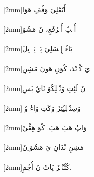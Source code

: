 \documentclass[a4paper, 12pt]{report}
\begin{document}
\begin{flushright}

{\scriptsize{}[2mm]}\textarabic{أَنْڠَلِيَ وَڤُڤِ هَوَا} \\ 

 \\ 

{\scriptsize{}[2mm]}\textarabic{أُپٖپٗ أُمٖرُفَعِ، نَ مَشُوَ} \\ 

 \\ 

{\scriptsize{}[2mm]}\textarabic{يَاءٗ إِمٖسَلِيَ پَلٖ پَلٖ بِلَ} \\ 

 \\ 

{\scriptsize{}[2mm]}\textarabic{يَ كْوٖنْدَ، كْوَنِ هَونَ مَشِنِ} \\ 

 \\ 

{\scriptsize{}[2mm]}\textarabic{نَ لَئِتِ وَنْڠٖلِكُوَ نَايٗ بَسِ} \\ 

 \\ 

{\scriptsize{}[2mm]}\textarabic{وَسِنْڠٖلِپٗتِزَ وَكَتِ وَاءٗ وٗتٖ} \\ 

 \\ 

{\scriptsize{}[2mm]}\textarabic{وَاپٗ هَپَ هَپَ. كْوَ هِڤْيٗ} \\ 

 \\ 

{\scriptsize{}[2mm]}\textarabic{مَشِنِ نْدَانِ يَ مَشُوَ ِنَ} \\ 

 \\ 

{\scriptsize{}[2mm]}\textarabic{كُئٗنْڠٖزَ پَاتٗ نَ أُچُمِ.} \\ 

 \\ 


\end{flushright}
\end{document}
